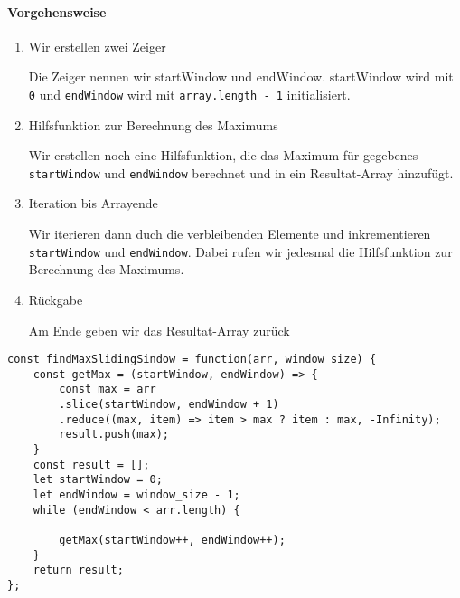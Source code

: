 \documentclass{book}
\begin{document}
\paragraph{Vorgehensweise}
\begin{enumerate} 
	\item Wir erstellen zwei Zeiger
	
	Die Zeiger nennen wir startWindow und endWindow. startWindow wird mit \lstinline|0| und \lstinline|endWindow| wird mit \lstinline|array.length - 1| initialisiert. 
	
	\item Hilfsfunktion zur Berechnung des Maximums
	
	Wir erstellen noch eine Hilfsfunktion, die das Maximum für gegebenes \lstinline|startWindow| und \lstinline|endWindow| berechnet und in ein Resultat-Array hinzufügt.
	
	\item Iteration bis Arrayende
	
	Wir iterieren dann duch die verbleibenden Elemente und inkrementieren \lstinline|startWindow| und \lstinline|endWindow|. Dabei rufen wir jedesmal die Hilfsfunktion zur Berechnung des Maximums.
	
	\item Rückgabe
	
	Am Ende geben wir das Resultat-Array zurück
\end{enumerate}

\begin{lstlisting}[caption=My Javascript Example]
const findMaxSlidingSindow = function(arr, window_size) {
	const getMax = (startWindow, endWindow) => {
		const max = arr
		.slice(startWindow, endWindow + 1)
		.reduce((max, item) => item > max ? item : max, -Infinity);
		result.push(max);
	}
	const result = [];
	let startWindow = 0;
	let endWindow = window_size - 1;
	while (endWindow < arr.length) {
		
		getMax(startWindow++, endWindow++);    
	}
	return result;
};
\end{lstlisting}
\end{document}
